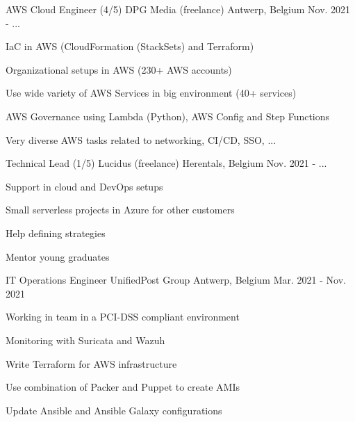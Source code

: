 

\begin{cventries}

  \cventry
    {AWS Cloud Engineer (4/5)} %
    {DPG Media (freelance)} %
    {Antwerp, Belgium} %
    {Nov. 2021 - ...} %
    {
      \begin{cvitems} %
        \item {IaC in AWS (CloudFormation (StackSets) and Terraform)}
        \item {Organizational setups in AWS (230+ AWS accounts)}
        \item {Use wide variety of AWS Services in big environment (40+ services)}
        \item {AWS Governance using Lambda (Python), AWS Config and Step Functions}
        \item {Very diverse AWS tasks related to networking, CI/CD, SSO, ...}
      \end{cvitems}
    }

  \cventry
    {Technical Lead (1/5)} %
    {Lucidus (freelance)} %
    {Herentals, Belgium} %
    {Nov. 2021 - ...} %
    {
      \begin{cvitems} %
        \item {Support in cloud and DevOps setups}
        \item {Small serverless projects in Azure for other customers}
        \item {Help defining strategies}
        \item {Mentor young graduates}
      \end{cvitems}
    }

  \cventry
    {IT Operations Engineer} %
    {UnifiedPost Group} %
    {Antwerp, Belgium} %
    {Mar. 2021 - Nov. 2021} %
    {
      \begin{cvitems} %
        \item {Working in team in a PCI-DSS compliant environment}
        \item {Monitoring with Suricata and Wazuh}
        \item {Write Terraform for AWS infrastructure}
        \item {Use combination of Packer and Puppet to create AMIs}
        \item {Update Ansible and Ansible Galaxy configurations}
      \end{cvitems}
    }


\end{cventries}
